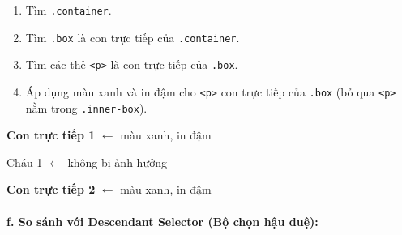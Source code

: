 \documentclass[11pt,oneside]{book}
\newcommand{\codeinline}[1]{\textcolor{accentOrange}{\texttt{#1}}}
\begin{document}
\begin{noteBox}
\begin{enumerate}[leftmargin=1.5em, itemsep=2pt, parsep=0pt]
    \item Tìm \codeinline{.container}.
    \item Tìm \codeinline{.box} là con trực tiếp của \codeinline{.container}.
    \item Tìm các thẻ \codeinline{<p>} là con trực tiếp của \codeinline{.box}.
    \item Áp dụng màu xanh và in đậm cho \codeinline{<p>} con trực tiếp của \codeinline{.box} (bỏ qua \codeinline{<p>} nằm trong \codeinline{.inner-box}).
\end{enumerate}
\end{noteBox}

\begin{browserWindow}
\sffamily\small
\begin{tcolorbox}[arc=2pt, colback=primaryBlue!5, colframe=primaryBlue!40, boxrule=1pt, title={\sffamily\small\color{white}\textbf{.container}}, colbacktitle=primaryBlue!70]
\begin{tcolorbox}[arc=2pt, colback=white, colframe=primaryBlue!70, boxrule=1pt, title={\sffamily\scriptsize\color{white}\textbf{.box}}, colbacktitle=primaryBlue!90]
\textcolor{primaryBlue}{\textbf{Con trực tiếp 1}} {\small\textcolor{gray!60}{$\leftarrow$ màu xanh, in đậm}} \par\vspace{2pt}
\begin{tcolorbox}[arc=2pt, colback=gray!10, colframe=gray!40, boxrule=1pt, title={\sffamily\tiny\color{darkText}.inner-box}]
\textcolor{darkText}{Cháu 1} {\small\textcolor{gray!60}{$\leftarrow$ không bị ảnh hưởng}}
\end{tcolorbox}\vspace{2pt}
\textcolor{primaryBlue}{\textbf{Con trực tiếp 2}} {\small\textcolor{gray!60}{$\leftarrow$ màu xanh, in đậm}}
\end{tcolorbox}
\end{tcolorbox}
\end{browserWindow}

\paragraph{f. So sánh với Descendant Selector (Bộ chọn hậu duệ):}
\end{document}
